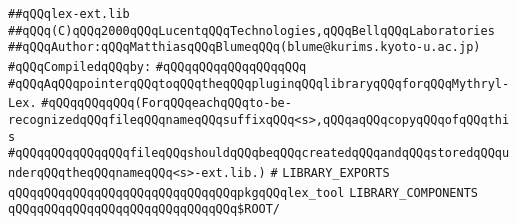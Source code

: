 \label{src/app/makelib/tools/mllex/lex-ext.lib}
\verb|##qQQqlex-ext.lib|\newline
\verb|##qQQq(C)qQQq2000qQQqLucentqQQqTechnologies,qQQqBellqQQqLaboratories|\newline
\verb|##qQQqAuthor:qQQqMatthiasqQQqBlumeqQQq(blume@kurims.kyoto-u.ac.jp)|\newline
\newline
\verb|#qQQqCompiledqQQqby:|\newline
\verb|#qQQqqQQqqQQqqQQqqQQq|\newline
\newline
\newline
\newline
\verb|#qQQqAqQQqpointerqQQqtoqQQqtheqQQqpluginqQQqlibraryqQQqforqQQqMythryl-Lex.|\newline
\verb|#qQQqqQQqqQQq(ForqQQqeachqQQqto-be-recognizedqQQqfileqQQqnameqQQqsuffixqQQq<s>,qQQqaqQQqcopyqQQqofqQQqthis|\newline
\verb|#qQQqqQQqqQQqqQQqfileqQQqshouldqQQqbeqQQqcreatedqQQqandqQQqstoredqQQqunderqQQqtheqQQqnameqQQq<s>-ext.lib.)|\newline
\verb|#|\newline
\newline
\newline
\newline
\verb|LIBRARY_EXPORTS|\newline
\newline
\verb|qQQqqQQqqQQqqQQqqQQqqQQqqQQqqQQqpkgqQQqlex_tool|\newline
\newline
\newline
\newline
\verb|LIBRARY_COMPONENTS|\newline
\newline
\verb|qQQqqQQqqQQqqQQqqQQqqQQqqQQqqQQq$ROOT/|\newline


